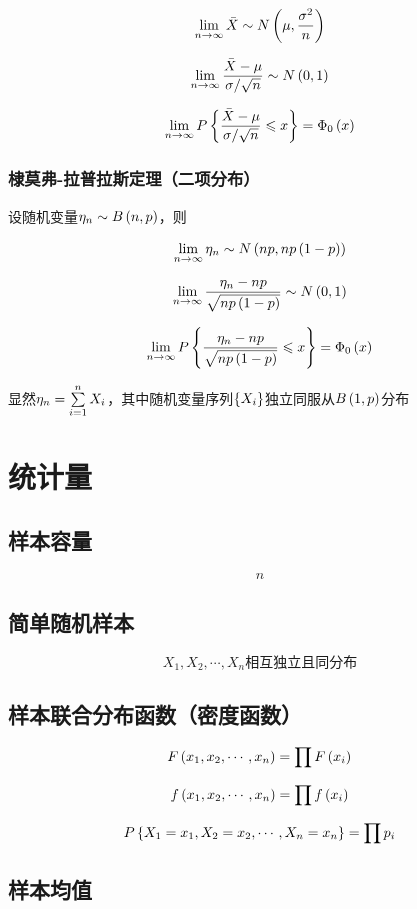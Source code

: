 \documentclass{article}
\begin{document}
\[\lim_{n\to\infty}\bar X\sim N\left(\mu,\frac{\sigma^2}n\right)\]

\[\lim_{n\to\infty}\frac{\bar X-\mu}{\sigma/\sqrt n}\sim N\left(0,1\right)\]

\[\lim_{n\to\infty}P\left\{\frac{\bar X-\mu}{\sigma/\sqrt n}\leqslant x\right\}=\Phi_0\left(x\right)\]

\subsubsection{棣莫弗-拉普拉斯定理（二项分布）}

设随机变量$\eta_n\sim B\left(n,p\right)$，则

\[\lim_{n\to\infty}\eta_n\sim N\left(np,np\left(1-p\right)\right)\]

\[\lim_{n\to\infty}\frac{\eta_n-np}{\sqrt{np\left(1-p\right)}}\sim N\left(0,1\right)\]

\[\lim_{n\to\infty}P\left\{\frac{\eta_n-np}{\sqrt{np\left(1-p\right)}}\leqslant x\right\}=\Phi_0\left(x\right)\]

显然$\eta_n=\sum\limits_{i=1}^n X_i$，其中随机变量序列$\left\{X_i\right\}$独立同服从$B\left(1,p\right)$分布

\section{统计量}

\subsection{样本容量}

\[n\]

\subsection{简单随机样本}

\[X_1,X_2,\cdots,X_n\text{相互独立且同分布}\]

\subsection{样本联合分布函数（密度函数）}

\[F\left(x_1,x_2,\cdots,x_n\right)=\prod F\left(x_i\right)\]

\[f\left(x_1,x_2,\cdots,x_n\right)=\prod f\left(x_i\right)\]

\[P\left\{X_1=x_1,X_2=x_2,\cdots,X_n=x_n\right\}=\prod p_i\]

\subsection{样本均值}
\end{document}

